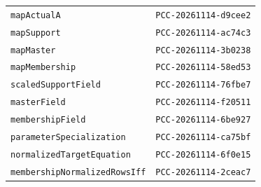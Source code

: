 \documentclass[
  10pt,
]{article}
\begin{document}
\begin{longtable}[]{@{}ll@{}}
\texttt{mapActualA} & \texttt{PCC-20261114-d9cee2} \\
\texttt{mapSupport} & \texttt{PCC-20261114-ac74c3} \\
\texttt{mapMaster} & \texttt{PCC-20261114-3b0238} \\
\texttt{mapMembership} & \texttt{PCC-20261114-58ed53} \\
\texttt{scaledSupportField} & \texttt{PCC-20261114-76fbe7} \\
\texttt{masterField} & \texttt{PCC-20261114-f20511} \\
\texttt{membershipField} & \texttt{PCC-20261114-6be927} \\
\texttt{parameterSpecialization} & \texttt{PCC-20261114-ca75bf} \\
\texttt{normalizedTargetEquation} & \texttt{PCC-20261114-6f0e15} \\
\texttt{membershipNormalizedRowsIff} & \texttt{PCC-20261114-2ceac7} \\
\end{longtable}
\end{document}

